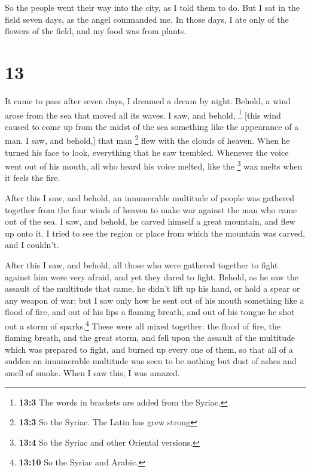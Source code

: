 So the people went their way into the city, as I told
them to do.  But I sat in the field seven days, as the
angel commanded me. In those days, I ate only of the flowers of the
field, and my food was from plants.

\hypertarget{section-12}{%
\section{13}\label{section-12}}

 It came to pass after seven days, I dreamed a dream by
night.  Behold, a wind arose from the sea that moved all
its waves.  I saw, and behold, \footnote{\textbf{13:3} The
  words in brackets are added from the Syriac.} {[}this wind caused to
come up from the midst of the sea something like the appearance of a
man. I saw, and behold,{]} that man \footnote{\textbf{13:3} So the
  Syriac. The Latin has grew strong} flew with the clouds of heaven.
When he turned his face to look, everything that he saw trembled.
 Whenever the voice went out of his mouth, all who heard
his voice melted, like the \footnote{\textbf{13:4} So the Syriac and
  other Oriental versions.} wax melts when it feels the fire.

 After this I saw, and behold, an innumerable multitude of
people was gathered together from the four winds of heaven to make war
against the man who came out of the sea.  I saw, and
behold, he carved himself a great mountain, and flew up onto it.
 I tried to see the region or place from which the
mountain was carved, and I couldn't.

 After this I saw, and behold, all those who were gathered
together to fight against him were very afraid, and yet they dared to
fight.  Behold, as he saw the assault of the multitude
that came, he didn't lift up his hand, or hold a spear or any weapon of
war;  but I saw only how he sent out of his mouth
something like a flood of fire, and out of his lips a flaming breath,
and out of his tongue he shot out a storm of sparks.\footnote{\textbf{13:10}
  So the Syriac and Arabic.}  These were all mixed
together: the flood of fire, the flaming breath, and the great storm,
and fell upon the assault of the multitude which was prepared to fight,
and burned up every one of them, so that all of a sudden an innumerable
multitude was seen to be nothing but dust of ashes and smell of smoke.
When I saw this, I was amazed.

